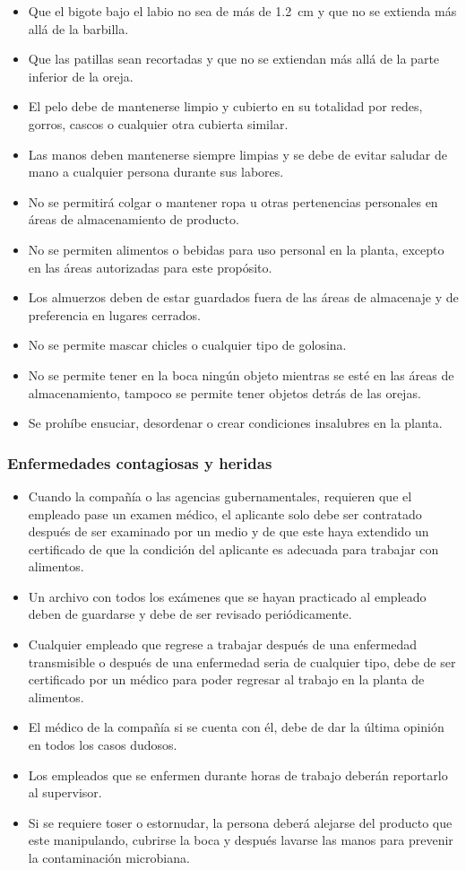 \begin{itemize}
	\item Que el bigote bajo el labio no sea de más de \SI{1.2}{\centi\meter} y que no se extienda más allá de la barbilla.
	\item Que las patillas sean recortadas y que no se extiendan más allá de la parte inferior de la oreja.
	\item El pelo debe de mantenerse limpio y cubierto en su totalidad por redes, gorros, cascos o cualquier otra cubierta similar.
	\item Las manos deben mantenerse siempre limpias y se debe de evitar saludar de mano a cualquier persona durante sus labores.
	\item No se permitirá colgar o mantener ropa u otras pertenencias personales en áreas de almacenamiento de producto.
	\item No se permiten alimentos o bebidas para uso personal en la planta, excepto en las áreas autorizadas para este propósito.
	\item Los almuerzos deben de estar guardados fuera de las áreas de almacenaje y de preferencia en lugares cerrados.
	\item No se permite mascar chicles o cualquier tipo de golosina.
	\item No se permite tener en la boca ningún objeto mientras se esté en las áreas de almacenamiento, tampoco se permite tener objetos detrás de las orejas.
	\item Se prohíbe ensuciar, desordenar o crear condiciones insalubres en la planta.
\end{itemize}

\subsubsection{Enfermedades contagiosas y heridas}
\begin{itemize}
	\item Cuando la compañía o las agencias gubernamentales, requieren que el empleado pase un examen médico, el aplicante solo debe ser contratado después de ser examinado por un medio y de que este haya extendido un certificado de que la condición del aplicante es adecuada para trabajar con alimentos.
	\item Un archivo con todos los exámenes que se hayan practicado al empleado deben de guardarse y debe de ser revisado periódicamente.
	\item Cualquier empleado que regrese a trabajar después de una enfermedad transmisible o después de una enfermedad seria de cualquier tipo, debe de ser certificado por un médico para poder regresar al trabajo en la planta de alimentos.
	\item El médico de la compañía si se cuenta con él, debe de dar la última opinión en todos los casos dudosos.
	\item Los empleados que se enfermen durante horas de trabajo deberán reportarlo al supervisor.
	\item Si se requiere toser o estornudar, la persona deberá alejarse del producto que este manipulando, cubrirse la boca y después lavarse las manos para prevenir la contaminación microbiana.
\end{itemize}

